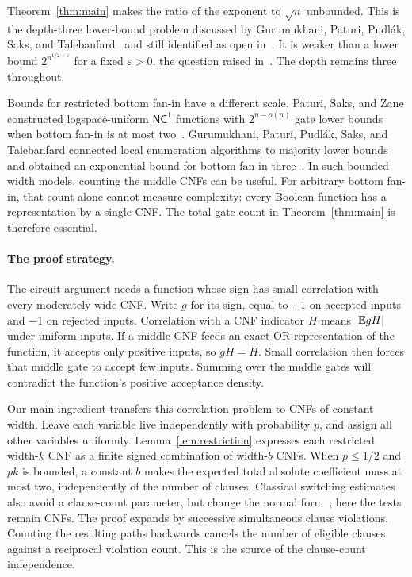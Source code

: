 Theorem~\ref{thm:main} makes the ratio of the exponent to \(\sqrt n\)
unbounded.  This is the depth-three lower-bound problem discussed by
Gurumukhani, Paturi, Pudl\'ak, Saks, and
Talebanfard~\cite[Section~1.1]{GPPST24} and still identified as open
in~\cite[Section~1]{GKPRT26}.  It is weaker than a lower bound
\(2^{n^{1/2+\varepsilon}}\) for a fixed \(\varepsilon>0\), the
question raised in~\cite[Section~5, Problem~2]{HJP95}.
The depth remains three throughout.

Bounds for restricted bottom fan-in have a different scale.
Paturi, Saks, and Zane constructed logspace-uniform \(\mathsf{NC}^1\)
functions with \(2^{n-o(n)}\) gate lower bounds when bottom fan-in is
at most two~\cite[Corollary~5.4]{PSZ00}.  Gurumukhani, Paturi,
Pudl\'ak, Saks, and Talebanfard connected local enumeration algorithms
to majority lower bounds and obtained an exponential bound for bottom
fan-in three~\cite[Proposition~3 and Corollary~5]{GPPST24}.
In such bounded-width models, counting the middle CNFs can be useful.
For arbitrary bottom fan-in, that count alone cannot measure complexity:
every Boolean function has a representation by a single CNF.  The total
gate count in Theorem~\ref{thm:main} is therefore essential.

\paragraph{The proof strategy.}
The circuit argument needs a function whose sign has small correlation
with every moderately wide CNF.  Write \(g\) for its sign, equal to
\(+1\) on accepted inputs and \(-1\) on rejected inputs.  Correlation
with a CNF indicator \(H\) means \(\lvert\mathbb E gH\rvert\) under uniform inputs.
If a middle CNF feeds an exact OR representation of the function, it
accepts only positive inputs, so \(gH=H\).  Small correlation then
forces that middle gate to accept few inputs.  Summing over the middle
gates will contradict the function's positive acceptance density.

Our main ingredient transfers this correlation problem to CNFs of
constant width.  Leave each variable live independently with probability
\(p\), and assign all other variables uniformly.  Lemma~\ref{lem:restriction}
expresses each restricted width-\(k\) CNF as a finite signed combination
of width-\(b\) CNFs.  When \(p\le1/2\) and \(pk\) is bounded, a
constant \(b\) makes the expected total absolute coefficient mass at
most two, independently of the number of clauses.  Classical switching
estimates also avoid a clause-count parameter, but change the normal
form~\cite[Section~3, Main Lemma]{H89}; here the tests remain CNFs.
The proof expands by successive simultaneous clause violations.
Counting the resulting paths backwards cancels the number of eligible
clauses against a reciprocal violation count.  This is the source of
the clause-count independence.

